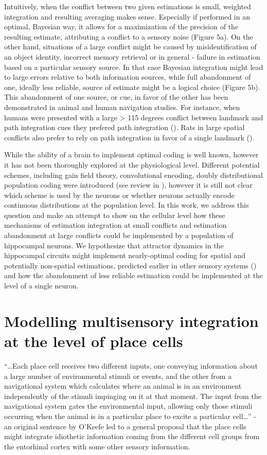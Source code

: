 Intuitively, when the conflict between two given estimations is small, weighted integration and resulting averaging makes sense. Especially if performed in an optimal, Bayesian way, it allows for a maximization of the precision of the resulting estimate, attributing a conflict to a sensory noise (Figure 5a). On the other hand, situations of a large conflict might be caused by misidentification of an object identity, incorrect memory retrieval or in general - failure in estimation based on a particular sensory source. In that case Bayesian integration might lead to large errors relative to both information sources, while full abandonment of one, ideally less reliable, source of estimate might be a logical choice (Figure 5b). This abandonment of one source, or cue, in favor of the other has been demonstrated in animal and human navigation studies. For instance, when humans were presented with a large > 115 degrees conflict between landmark and path integration cues they prefered path integration (\cite{ZHAO201596}). Rats in large spatial conflicts also prefer to rely on path integration in favor of a single landmark (\cite{Shettleworth2005}).

While the ability of a brain to implement optimal coding is well known, however it has not been thoroughly explored at the physiological level. Different potential schemes, including gain field theory, convolutional encoding, doubly distributional population coding were introduced (see review in \cite{Pouget2003}), however it is still not clear which scheme is used by the neurons or whether neurons actually encode continuous distributions at the population level. In this work, we address this question and make an attempt to show on the cellular level how these mechanisms of estimation integration at small conflicts and estimation abandonment at large conflicts could be implemented by a population of hippocampal neurons. We hypothesize that attractor dynamics in the hippocampal circuits might implement nearly-optimal coding for spatial and potentially non-spatial estimations, predicted earlier in other sensory systems (\cite{Jeffery2016}) and how the abandonment of less reliable estimation could be implemented at the level of a single neuron.


\section{Modelling multisensory integration at the level of place cells}
\label{sec:modelling}

“…Each place cell receives two different inputs, one conveying information about a large number of environmental stimuli or events, and the other from a navigational system which calculates where an animal is in an environment independently of the stimuli impinging on it at that moment. The input from the navigational system gates the environmental input, allowing only those stimuli occurring when the animal is in a particular place to excite a particular cell…” - an original sentence by O’Keefe led to a general proposal that the place cells might integrate idiothetic information coming from the different cell groups from the entorhinal cortex with some other sensory information.

